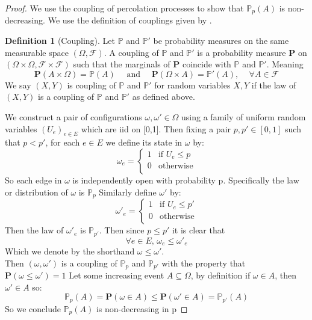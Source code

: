 \documentclass[a4paper,11pt]{article}
\theoremstyle{definition}
\newtheorem{definition}[theorem]{Definition}
\newcommand{\prob}{\mathbb{P}_p}
\begin{document}
\begin{proof}
	We use the coupling of percolation processes to show that $\prob(A)$ is non-decreasing. We use the definition of couplings given by \cite{roch2015modern}.

	\begin{definition}[Coupling]
		Let $\mathbb{P}$ and $\mathbb{P}'$ be probability measures on the same measurable space $(\Omega,\mathcal{F})$.
		A coupling of $\mathbb{P}$ and $\mathbb{P}'$ is a probability measure $\mathbf{P}$ on $(\Omega\times\Omega,\mathcal{F}\times \mathcal{F})$ such that the marginals of $\mathbf{P}$ coincide with $\mathbb{P}$ and $\mathbb{P}'$.
		Meaning 
		$$\mathbf{P}(A \times \Omega) = \mathbb{P}(A) \quad \text{  and  } \quad \mathbf{P}(\Omega \times A) = \mathbb{P}'(A) \text{, }\quad \forall A \in \mathcal{F}$$
		We say $(X,Y)$ is coupling of $\mathbb{P}$ and $\mathbb{P}'$ for random variables $X,Y$ if the law of $(X,Y)$ is a coupling of $\mathbb{P}$ and $\mathbb{P}'$ as defined above.
	
	\end{definition}

	We construct a pair of configurations $\omega, \omega' \in \Omega$ using a family of uniform random variables $(U_e)_{e\in E}$ which are iid on [0,1].
	Then fixing a pair $p,p' \in [0,1]$ such that $p < p'$, for each $e \in E$ we define its state in $\omega$ by:
	$$\omega_e = \begin{cases}
		1 & \text{if }U_e \leq p\\
		0 & \text{otherwise}\\
	\end{cases} $$
	So each edge in $\omega$ is independently open with probability p. Specifically the law or distribution of $\omega$ is $\prob$ 
	  Similarly define $\omega'$ by:
	$$\omega'_e = \begin{cases}
		1 & \text{if }U_e \leq p'\\
		0 & \text{otherwise}\\
	\end{cases} $$
	Then the law of $\omega'_e$ is $\mathbb{P}_{p'}$. Then since $p \leq p'$ it is clear that
	$$\forall e \in E \text{, }\omega_e \leq \omega'_e $$
	Which we denote by the shorthand $\omega \leq \omega'$.\\
	Then $(\omega,\omega')$ is a coupling of $\mathbb{P}_{p}$ and $\mathbb{P}_{p'}$ with the property that $\mathbf{P}(\omega \leq \omega') = 1$
	Let some increasing event $A \subseteq \Omega$, by definition if $\omega \in A$, then $\omega' \in A$ so:
	$$\mathbb{P}_p(A) = \mathbf{P}(\omega \in A) \leq \mathbf{P}(\omega' \in A) = \mathbb{P}_{p'}(A)$$
	So we conclude $\prob(A)$ is non-decreasing in p

\end{proof}
\end{document}
